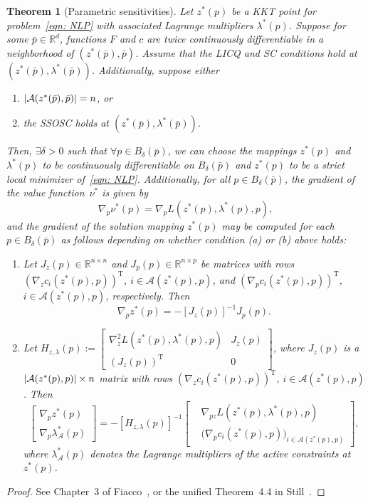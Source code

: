 \documentclass{article}
\newcommand{\tr}[1]{\ensuremath{{#1}^\text{T}}}
\DeclarePairedDelimiter\abs{\lvert}{\rvert}%
\newcommand{\A}{\mathcal{A}}
\newcommand{\R}{\mathbb{R}}
\newcommand{\1}[1]{\mathds{1}\left[#1\right]}
\newtheorem{theorem}{Theorem}[]
\begin{document}
\begin{theorem}[Parametric sensitivities]
\label{thm:parametric_sens} 
Let $z^*(p)$ be a KKT point for problem~\eqref{eqn: NLP} with associated Lagrange multipliers $\lambda^*(p)$.
Suppose for some $\bar{p} \in \R^d$, functions $F$ and $c$ are twice continuously differentiable in a neighborhood of $(z^*(\bar{p}), \bar{p})$. 
Assume that the LICQ and SC conditions hold at $(z^*(\bar{p}), \lambda^*(\bar{p}))$.
Additionally, suppose either 
\begin{enumerate}[label=(\alph*)]
\item $\abs{\A(z^*(\bar{p}),\bar{p})} = n$, or
\item the SSOSC holds at $(z^*(\bar{p}), \lambda^*(\bar{p}))$.
\end{enumerate}
Then, $\exists \delta > 0$ such that $\forall p \in B_{\delta}(\bar{p})$, we can choose the mappings $z^*(p)$ and $\lambda^*(p)$ to be continuously differentiable on $B_{\delta}(\bar{p})$ and $z^*(p)$ to be a strict local minimizer of~\eqref{eqn: NLP}.
Additionally, for all $p \in B_{\delta}(\bar{p})$, the gradient of the value function~$\nu^*$ is given by 
\[
\nabla_p \nu^*(p) = \nabla_p L(z^*(p),\lambda^*(p),p),
\]
and the gradient of the solution mapping $z^*(p)$ may be computed for each $p \in B_{\delta}(\bar{p})$ as follows depending on whether condition (a) or (b) above holds:
\begin{enumerate}[label=(\alph*)]
\item Let $J_z(p) \in \R^{n \times n}$ and $J_p(p) \in \R^{n \times p}$ be matrices with rows $\tr{(\nabla_z c_i(z^*(p),p))}$, $i \in \A(z^*(p),p)$, and $\tr{(\nabla_p c_i(z^*(p),p))}$, $i \in \A(z^*(p),p)$, respectively. Then
\[
\nabla_p z^*(p) = -[J_z(p)]^{-1} J_p(p).
\]
\item 
Let $H_{z,\lambda}(p) := \begin{bmatrix}
\nabla^2_z L(z^*(p),\lambda^*(p),p) & J_z(p) \\
\tr{(J_z(p))} & 0 
\end{bmatrix}$, where $J_z(p)$ is a $\abs{\A(z^*(p),p)} \times n$ matrix with rows $\tr{(\nabla_z c_i(z^*(p),p))}$, $i \in \A(z^*(p),p)$.
Then
\[
\begin{bmatrix}
\nabla_p z^*(p) \\
\nabla_p \lambda^*_{\A}(p)
\end{bmatrix}  = - [H_{z,\lambda}(p)]^{-1}
\begin{bmatrix}
&\nabla_{pz} L(z^*(p),\lambda^*(p),p) \\
&\bigl(\nabla_p c_i(z^*(p),p)\bigr)_{i \in \A(z^*(p),p)}
\end{bmatrix},
\]
where $\lambda^*_{\A}(p)$ denotes the Lagrange multipliers of the active constraints at $z^*(p)$. 
\end{enumerate}
\end{theorem}%
\begin{proof}
See Chapter~3 of Fiacco~\cite{fiacco1983}, or the unified Theorem~4.4 in Still~\cite{still2018lectures}.
\end{proof}
\end{document}
